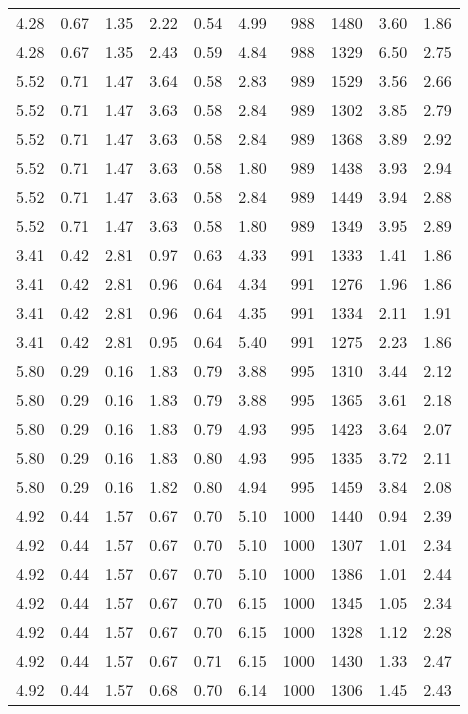 \begin{longtable}{rrrrrrrrrr}
4.28	&	0.67	&	1.35	&	2.22	&	0.54	&	4.99	&	988	&	1480	&	3.60	&	1.86	\\
4.28	&	0.67	&	1.35	&	2.43	&	0.59	&	4.84	&	988	&	1329	&	6.50	&	2.75	\\
5.52	&	0.71	&	1.47	&	3.64	&	0.58	&	2.83	&	989	&	1529	&	3.56	&	2.66	\\
5.52	&	0.71	&	1.47	&	3.63	&	0.58	&	2.84	&	989	&	1302	&	3.85	&	2.79	\\
5.52	&	0.71	&	1.47	&	3.63	&	0.58	&	2.84	&	989	&	1368	&	3.89	&	2.92	\\
5.52	&	0.71	&	1.47	&	3.63	&	0.58	&	1.80	&	989	&	1438	&	3.93	&	2.94	\\
5.52	&	0.71	&	1.47	&	3.63	&	0.58	&	2.84	&	989	&	1449	&	3.94	&	2.88	\\
5.52	&	0.71	&	1.47	&	3.63	&	0.58	&	1.80	&	989	&	1349	&	3.95	&	2.89	\\
3.41	&	0.42	&	2.81	&	0.97	&	0.63	&	4.33	&	991	&	1333	&	1.41	&	1.86	\\
3.41	&	0.42	&	2.81	&	0.96	&	0.64	&	4.34	&	991	&	1276	&	1.96	&	1.86	\\
3.41	&	0.42	&	2.81	&	0.96	&	0.64	&	4.35	&	991	&	1334	&	2.11	&	1.91	\\
3.41	&	0.42	&	2.81	&	0.95	&	0.64	&	5.40	&	991	&	1275	&	2.23	&	1.86	\\
5.80	&	0.29	&	0.16	&	1.83	&	0.79	&	3.88	&	995	&	1310	&	3.44	&	2.12	\\
5.80	&	0.29	&	0.16	&	1.83	&	0.79	&	3.88	&	995	&	1365	&	3.61	&	2.18	\\
5.80	&	0.29	&	0.16	&	1.83	&	0.79	&	4.93	&	995	&	1423	&	3.64	&	2.07	\\
5.80	&	0.29	&	0.16	&	1.83	&	0.80	&	4.93	&	995	&	1335	&	3.72	&	2.11	\\
5.80	&	0.29	&	0.16	&	1.82	&	0.80	&	4.94	&	995	&	1459	&	3.84	&	2.08	\\
4.92	&	0.44	&	1.57	&	0.67	&	0.70	&	5.10	&	1000	&	1440	&	0.94	&	2.39	\\
4.92	&	0.44	&	1.57	&	0.67	&	0.70	&	5.10	&	1000	&	1307	&	1.01	&	2.34	\\
4.92	&	0.44	&	1.57	&	0.67	&	0.70	&	5.10	&	1000	&	1386	&	1.01	&	2.44	\\
4.92	&	0.44	&	1.57	&	0.67	&	0.70	&	6.15	&	1000	&	1345	&	1.05	&	2.34	\\
4.92	&	0.44	&	1.57	&	0.67	&	0.70	&	6.15	&	1000	&	1328	&	1.12	&	2.28	\\
4.92	&	0.44	&	1.57	&	0.67	&	0.71	&	6.15	&	1000	&	1430	&	1.33	&	2.47	\\
4.92	&	0.44	&	1.57	&	0.68	&	0.70	&	6.14	&	1000	&	1306	&	1.45	&	2.43	\\

\end{longtable}
